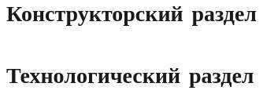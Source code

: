 \newpage
\section{Конструкторский раздел}

\newpage
\section{Технологический раздел}

\newpage
{}

\newpage

\newpage
{}
